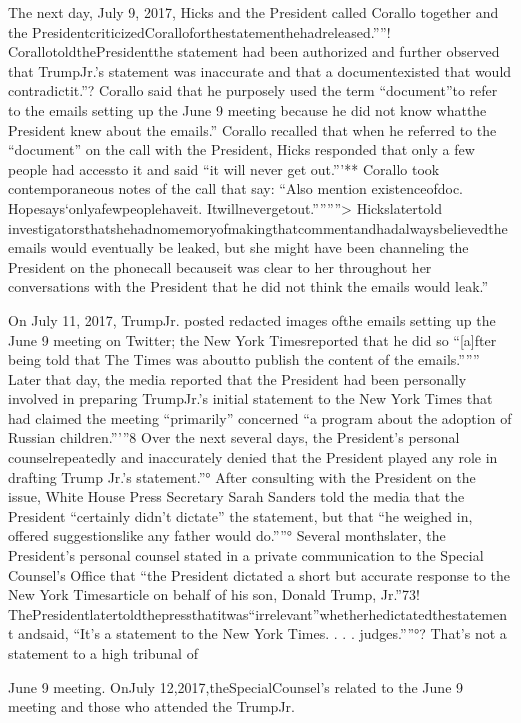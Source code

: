 The next day, July 9, 2017, Hicks and the President called Corallo together and the PresidentcriticizedCoralloforthestatementhehadreleased.””! CorallotoldthePresidentthe statement had been authorized and further observed that TrumpJr.’s statement was inaccurate and that a documentexisted that would contradictit.”? Corallo said that he purposely used the term “document”to refer to the emails setting up the June 9 meeting because he did not know whatthe President knew about the emails.” Corallo recalled that when he referred to the “document” on the call with the President, Hicks responded that only a few people had accessto it and said “it will never get out.”’** Corallo took contemporaneous notes of the call that say: “Also mention existenceofdoc. Hopesays‘onlyafewpeoplehaveit. Itwillnevergetout.””””> Hickslatertold investigatorsthatshehadnomemoryofmakingthatcommentandhadalwaysbelievedtheemails would eventually be leaked, but she might have been channeling the President on the phonecall becauseit was clear to her throughout her conversations with the President that he did not think the emails would leak.”

On July 11, 2017, TrumpJr. posted redacted images ofthe emails setting up the June 9 meeting on Twitter; the New York Timesreported that he did so “[a]fter being told that The Times was aboutto publish the content of the emails.””” Later that day, the media reported that the President had been personally involved in preparing TrumpJr.’s initial statement to the New York Times that had claimed the meeting “primarily” concerned “a program about the adoption of Russian children.”’”8 Over the next several days, the President’s personal counselrepeatedly and inaccurately denied that the President played any role in drafting Trump Jr.’s statement.”° After consulting with the President on the issue, White House Press Secretary Sarah Sanders told the media that the President “certainly didn’t dictate” the statement, but that “he weighed in, offered suggestionslike any father would do.””° Several monthslater, the President’s personal counsel stated in a private communication to the Special Counsel’s Office that “the President dictated a short but accurate response to the New York Timesarticle on behalf of his son, Donald Trump,
Jr.”73! ThePresidentlatertoldthepressthatitwas“irrelevant”whetherhedictatedthestatement
andsaid, “It’s a statement to the New York Times. . . . judges.””°?
That’s not a statement to a high tribunal of

June 9 meeting.
OnJuly 12,2017,theSpecialCounsel’s
related to the June 9 meeting and those who attended the
TrumpJr.

